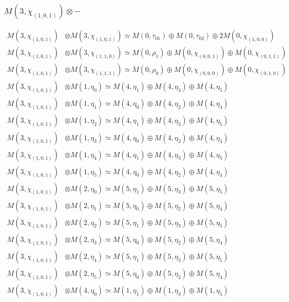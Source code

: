 \subsubsection{$ M(3,\chi_{(1,0,1)})\otimes -$}
\begin{align*}
M(3,\chi_{(1,0,1)}) &\otimes M(3,\chi_{(1,0,1)}) \simeq M(0,\tau_{01}) \oplus M(0,\tau_{02}) \oplus 2 M(0,\chi_{(1,0,0)}) \\
M(3,\chi_{(1,0,1)}) &\otimes M(3,\chi_{(1,1,0)}) \simeq M(0,\rho_{1}) \oplus M(0,\chi_{(0,0,1)}) \oplus M(0,\chi_{(0,1,1)}) \\
M(3,\chi_{(1,0,1)}) &\otimes M(3,\chi_{(1,1,1)}) \simeq M(0,\rho_{0}) \oplus M(0,\chi_{(0,0,0)}) \oplus M(0,\chi_{(0,1,0)}) \\
M(3,\chi_{(1,0,1)}) &\otimes M(1,\eta_{0}) \simeq M(4,\eta_{1}) \oplus M(4,\eta_{3}) \oplus M(4,\eta_{5}) \\
M(3,\chi_{(1,0,1)}) &\otimes M(1,\eta_{1}) \simeq M(4,\eta_{0}) \oplus M(4,\eta_{2}) \oplus M(4,\eta_{4}) \\
M(3,\chi_{(1,0,1)}) &\otimes M(1,\eta_{2}) \simeq M(4,\eta_{1}) \oplus M(4,\eta_{3}) \oplus M(4,\eta_{5}) \\
M(3,\chi_{(1,0,1)}) &\otimes M(1,\eta_{3}) \simeq M(4,\eta_{0}) \oplus M(4,\eta_{2}) \oplus M(4,\eta_{4}) \\
M(3,\chi_{(1,0,1)}) &\otimes M(1,\eta_{4}) \simeq M(4,\eta_{1}) \oplus M(4,\eta_{3}) \oplus M(4,\eta_{5}) \\
M(3,\chi_{(1,0,1)}) &\otimes M(1,\eta_{5}) \simeq M(4,\eta_{0}) \oplus M(4,\eta_{2}) \oplus M(4,\eta_{4}) \\
M(3,\chi_{(1,0,1)}) &\otimes M(2,\eta_{0}) \simeq M(5,\eta_{1}) \oplus M(5,\eta_{3}) \oplus M(5,\eta_{5}) \\
M(3,\chi_{(1,0,1)}) &\otimes M(2,\eta_{1}) \simeq M(5,\eta_{0}) \oplus M(5,\eta_{2}) \oplus M(5,\eta_{4}) \\
M(3,\chi_{(1,0,1)}) &\otimes M(2,\eta_{2}) \simeq M(5,\eta_{1}) \oplus M(5,\eta_{3}) \oplus M(5,\eta_{5}) \\
M(3,\chi_{(1,0,1)}) &\otimes M(2,\eta_{3}) \simeq M(5,\eta_{0}) \oplus M(5,\eta_{2}) \oplus M(5,\eta_{4}) \\
M(3,\chi_{(1,0,1)}) &\otimes M(2,\eta_{4}) \simeq M(5,\eta_{1}) \oplus M(5,\eta_{3}) \oplus M(5,\eta_{5}) \\
M(3,\chi_{(1,0,1)}) &\otimes M(2,\eta_{5}) \simeq M(5,\eta_{0}) \oplus M(5,\eta_{2}) \oplus M(5,\eta_{4}) \\
M(3,\chi_{(1,0,1)}) &\otimes M(4,\eta_{0}) \simeq M(1,\eta_{1}) \oplus M(1,\eta_{3}) \oplus M(1,\eta_{5}) \\

\end{align*}
